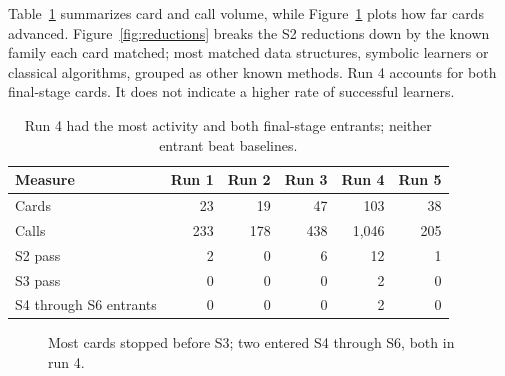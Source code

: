 Table~\ref{tab:runs} summarizes card and call volume, while Figure~\ref{fig:reach} plots how far cards advanced. Figure~\ref{fig:reductions} breaks the S2 reductions down by the known family each card matched; most matched data structures, symbolic learners or classical algorithms, grouped as other known methods. Run 4 accounts for both final-stage cards. It does not indicate a higher rate of successful learners.

\begin{table}[ht]
\centering\small
\caption{Run 4 had the most activity and both final-stage entrants; neither entrant beat baselines.}
\label{tab:runs}
\begin{tabular}{lrrrrr}
\toprule
Measure & Run 1 & Run 2 & Run 3 & Run 4 & Run 5 \\
\midrule
Cards & 23 & 19 & 47 & 103 & 38 \\
Calls & 233 & 178 & 438 & 1,046 & 205 \\
S2 pass & 2 & 0 & 6 & 12 & 1 \\
S3 pass & 0 & 0 & 0 & 2 & 0 \\
S4 through S6 entrants & 0 & 0 & 0 & 2 & 0 \\
\bottomrule
\end{tabular}
\end{table}

\begin{figure}[ht]
\centering
{}
\caption{Most cards stopped before S3; two entered S4 through S6, both in run 4.}
\label{fig:reach}
\end{figure}

